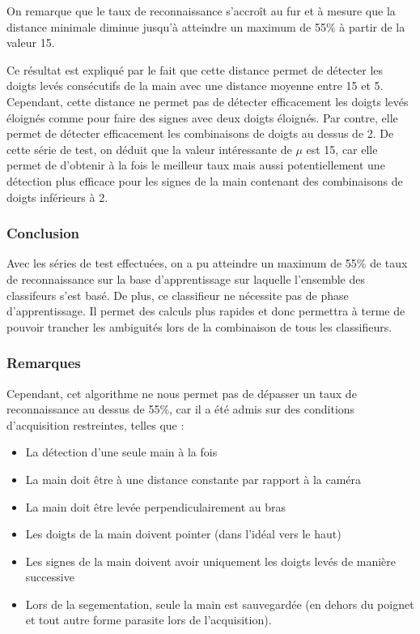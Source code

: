 On remarque que le taux de reconnaissance s’accroît au fur et à mesure que la distance minimale diminue jusqu’à atteindre un maximum de 55\% à partir de la valeur 15. 

Ce résultat est expliqué par le fait que cette distance permet de détecter les doigts levés consécutifs de la main avec une distance moyenne entre 15 et 5. Cependant, cette distance ne permet pas de détecter efficacement les doigts levés éloignés comme pour faire des signes avec deux doigts éloignés. Par contre, elle permet de détecter efficacement les combinaisons de doigts au dessus de 2. 
De cette série de test, on déduit que la valeur intéressante de $\mu$ est 15, car elle permet de d’obtenir à la fois le meilleur taux mais aussi potentiellement une détection plus efficace pour les signes de la main contenant des combinaisons de doigts inférieurs à 2.

\subsubsection{Conclusion}
Avec les séries de test effectuées, on a pu atteindre un maximum de 55\% de taux de reconnaissance sur la base d’apprentissage sur laquelle l'ensemble des classifeurs s'est basé. De plus, ce classifieur ne nécessite pas de phase d’apprentissage. Il permet des calculs plus rapides et donc permettra à terme de pouvoir trancher les ambiguités lors de la combinaison de tous les classifieurs.

\subsubsection{Remarques}
Cependant, cet algorithme ne nous permet pas de dépasser un taux de reconnaissance au dessus de 55\%, car il a été admis sur des conditions d’acquisition restreintes, telles que :
\begin{itemize}
\item La détection d’une seule main à la fois
\item La main doit être à une distance constante par rapport à la caméra
\item La main doit être levée perpendiculairement au bras
\item Les doigts de la main doivent pointer (dans l’idéal vers le haut)
\item Les signes de la main doivent avoir uniquement les doigts levés de manière successive
\item Lors de la segementation, seule la main est sauvegardée (en dehors du poignet et tout autre forme parasite lors de l’acquisition).
\end{itemize}